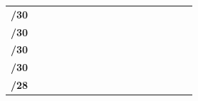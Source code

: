 \documentclass[11pt,a4paper]{report}
\begin{document}
\begin{longtable}[c]{rcccccccccccccccc}
\endhead
%
\hline
\endfoot
%
\endlastfoot
%
\textbf{/30}                                                                               &                               &                                &                                &                               &                                &                               &                                &                               &                             &                             &                             &                             &                             &                             & \cellcolor[HTML]{C09FE5}    & \cellcolor[HTML]{C09FE5}    \\
\textbf{/30}                                                                               &                               &                                &                                &                               &                                &                               &                                &                               &                             &                             &                             &                             & \cellcolor[HTML]{C09FE5}    & \cellcolor[HTML]{C09FE5}    &                             &                             \\
\textbf{/30}                                                                               &                               &                                &                                &                               &                                &                               &                                &                               &                             &                             & \cellcolor[HTML]{C09FE5}    & \cellcolor[HTML]{C09FE5}    &                             &                             &                             &                             \\
\textbf{/30}                                                                               &                               &                                &                                &                               &                                &                               &                                &                               & \cellcolor[HTML]{C09FE5}    & \cellcolor[HTML]{C09FE5}    &                             &                             &                             &                             &                             &                             \\
\textbf{/28}                                                                               &                               &                                &                                &                               &                                &                               & \cellcolor[HTML]{BFBFBF}       & \cellcolor[HTML]{BFBFBF}      &                             &                             &                             &                             &                             &                             &                             &                             \\

\end{longtable}
\end{document}
